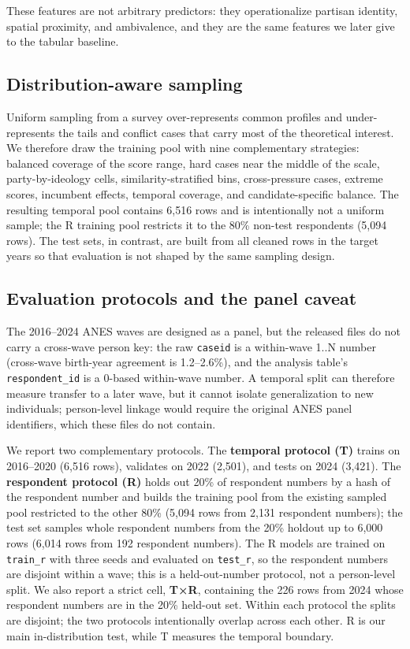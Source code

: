 These features are not arbitrary predictors: they operationalize
partisan identity, spatial proximity, and ambivalence, and they are the
same features we later give to the tabular baseline.

\subsection{Distribution-aware
sampling}\label{distribution-aware-sampling}

Uniform sampling from a survey over-represents common profiles and
under-represents the tails and conflict cases that carry most of the
theoretical interest. We therefore draw the training pool with nine
complementary strategies: balanced coverage of the score range, hard
cases near the middle of the scale, party-by-ideology cells,
similarity-stratified bins, cross-pressure cases, extreme scores,
incumbent effects, temporal coverage, and candidate-specific balance.
The resulting temporal pool contains 6,516 rows and is intentionally not
a uniform sample; the R training pool restricts it to the 80\% non-test
respondents (5,094 rows). The test sets, in contrast, are built from all
cleaned rows in the target years so that evaluation is not shaped by the
same sampling design.

\subsection{Evaluation protocols and the panel
caveat}\label{evaluation-protocols-and-the-panel-caveat}

The 2016--2024 ANES waves are designed as a panel, but the released
files do not carry a cross-wave person key: the raw \texttt{caseid} is a
within-wave 1..N number (cross-wave birth-year agreement is 1.2--2.6\%),
and the analysis table's \texttt{respondent\_id} is a 0-based
within-wave number. A temporal split can therefore measure transfer to a
later wave, but it cannot isolate generalization to new individuals;
person-level linkage would require the original ANES panel identifiers,
which these files do not contain.

We report two complementary protocols. The \textbf{temporal protocol
(T)} trains on 2016--2020 (6,516 rows), validates on 2022 (2,501), and
tests on 2024 (3,421). The \textbf{respondent protocol (R)} holds out
20\% of respondent numbers by a hash of the respondent number and builds
the training pool from the existing sampled pool restricted to the other
80\% (5,094 rows from 2,131 respondent numbers); the test set samples
whole respondent numbers from the 20\% holdout up to 6,000 rows (6,014
rows from 192 respondent numbers). The R models are trained on
\texttt{train\_r} with three seeds and evaluated on \texttt{test\_r}, so
the respondent numbers are disjoint within a wave; this is a
held-out-number protocol, not a person-level split. We also report a
strict cell, \textbf{T×R}, containing the 226 rows from 2024 whose
respondent numbers are in the 20\% held-out set. Within each protocol
the splits are disjoint; the two protocols intentionally overlap across
each other. R is our main in-distribution test, while T measures the
temporal boundary.


